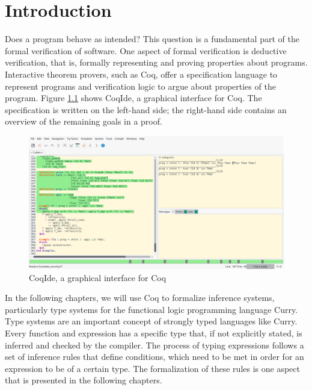 \documentclass[paper = a4, fleqn, twoside]{scrreprt}
\begin{document}

%   
%   

\chapter{Introduction}
Does a program behave as intended? This question is a fundamental part of the formal verification of software. One aspect of formal verification is deductive verification, that is, formally representing and proving properties about programs.\citep{filliatre2011deductive} Interactive theorem provers, such as Coq, offer a specification language to represent programs and verification logic to argue about properties of the program. Figure \ref{coqscreen} shows CoqIde, a graphical interface for Coq. The specification is written on the left-hand side; the right-hand side contains an overview of the remaining goals in a proof.
\begin{figure}[H]
\includegraphics[width=\linewidth]{images/coq.png}
\caption{CoqIde, a graphical interface for Coq}
\label{coqscreen}
\end{figure}\noindent 
In the following chapters, we will use Coq to formalize inference systems, particularly type systems for the functional logic programming language Curry. Type systems are an important concept of strongly typed languages like Curry. Every function and expression has a specific type that, if not explicitly stated, is inferred and checked by the compiler.
The process of typing expressions follows a set of inference rules that define conditions, which need to be met in order for an expression to be of a certain type. The formalization of these rules is one aspect that is presented in the following chapters. \\
\par \noindent
\end{document}
